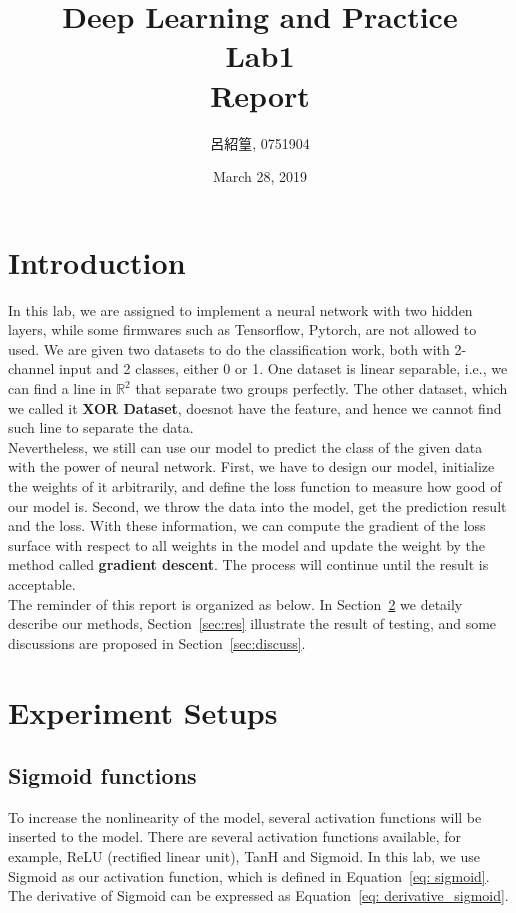\documentclass[12pt,a4paper]{article}
\title{Deep Learning and Practice \\Lab1 \\ Report}
\date{March 28, 2019}
\author{呂紹篁, 0751904}
\begin{document}
\thispagestyle{plain}
\cfoot{}
\maketitle


\section{Introduction} \label{sec:intro}
In this lab, we are assigned to implement a neural network with two hidden layers, while some firmwares such as Tensorflow, Pytorch, are not allowed to used. We are given two datasets to do the classification work, both with 2-channel input and 2 classes, either 0 or 1. One dataset is linear separable, i.e., we can find a line in ${\mathbb{R}}^2$ that separate two groups perfectly. The other dataset, which we called it \textbf{XOR Dataset}, doesnot have the feature, and hence we cannot find such line to separate the data. \\
Nevertheless, we still can use our model to predict the class of the given data with the power of neural network. First, we have to design our model, initialize the weights of it arbitrarily, and define the loss function to measure how good of our model is. Second, we throw the data into the model, get the prediction result and the loss. With these information, we can compute the gradient of the loss surface with respect to all weights in the model and update the weight by the method called \textbf{gradient descent}. The process will continue until the result is acceptable. \\
The reminder of this report is organized as below. In Section~\ref{sec:exp} we detaily describe our methods, Section~\ref{sec:res} illustrate the result of testing, and some discussions are proposed in Section~\ref{sec:discuss}.
\section{Experiment Setups} \label{sec:exp}
\subsection{Sigmoid functions}
To increase the nonlinearity of the model, several activation functions will be inserted to the model.  There are several activation functions available, for example, ReLU (rectified linear unit), TanH and Sigmoid. In this lab, we use Sigmoid as our activation function, which is defined in Equation~\ref{eq: sigmoid}. The derivative of Sigmoid can be expressed as Equation~\ref{eq: derivative_sigmoid}.
\end{document}
